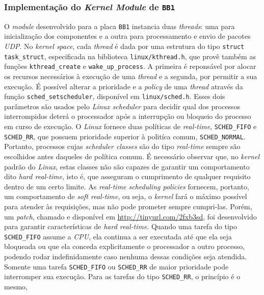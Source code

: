 \subsubsection{Implementação do \textit{Kernel Module} de \texttt{BB1}}
\label{sec:bb1}

O \textit{module} desenvolvido para a placa \texttt{BB1} instancia duas
\textit{threads}: uma para inicialização dos componentes e a outra para
processamento e envio de pacotes \textit{UDP}. No \textit{kernel space}, cada
\textit{thread} é dada por uma estrutura do tipo \texttt{struct task\_struct},
especificada na biblioteca \texttt{linux/kthread.h}, que provê também as funções
\texttt{kthread\_create} e \texttt{wake\_up\_process}. A primeira é reponsável
por alocar os recursos necessários à execução de uma \textit{thread} e a
segunda, por permitir a sua execução. É possível alterar a prioridade e a
\textit{policy} de uma \textit{thread} através da função
\texttt{sched\_setscheduler}, disponível em \texttt{linux/sched.h}. Esses dois
parâmetros são usados pelo \textit{Linux scheduler} para decidir qual dos
processos interrompidos deterá o processador após a interrupção ou bloqueio do
processo em curso de execução. O \textit{Linux} fornece duas políticas de
\textit{real-time}, \texttt{SCHED\_FIFO} e \texttt{SCHED\_RR}, que possuem
prioridade superior à politíca comum, \texttt{SCHED\_NORMAL}. Portanto,
processos cujas \textit{scheduler classes} são do tipo \textit{real-time} sempre
são escolhidos antes daqueles de política comum. É necessário observar que,  no
\textit{kernel} padrão do \textit{Linux},  estas classes não são capazes de
garantir um comportamento dito \textit{hard real-time}\cite{linuxlove}, isto é,
que asseguram o cumprimento de qualquer requisito dentro de um certo limite. As
\textit{real-time scheduling policies} fornecem, portanto, um comportamento de
\textit{soft real-time}, ou seja, o \textit{kernel} fará o máximo possível para
atender às requisições, mas não pode prometer sempre cumpri-las. Porém, um
\textit{patch}, chamado  e disponível em
\url{http://tinyurl.com/2fxb3sd}, foi desenvolvido para garantir características
de \textit{hard real-time}. Quando uma tarefa do tipo \texttt{SCHED\_FIFO}
assume a \textit{CPU}, ela continua a ser executada até que ela seja bloqueada
ou que ela conceda explicitamente o processador a outro processo, podendo rodar
indefinidamente caso nenhuma dessas condições seja atendida. Somente uma tarefa
\texttt{SCHED\_FIFO} ou \texttt{SCHED\_RR} de maior prioridade pode interromper
sua execução. Para as tarefas do tipo \texttt{SCHED\_RR}, o princípio é o mesmo,
